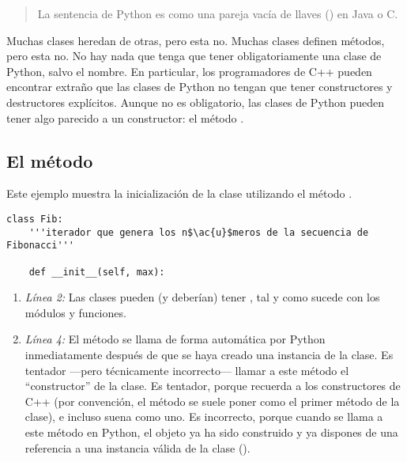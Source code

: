 \begin{quote}
La sentencia  de Python es como una pareja vacía de llaves (\codigo{\{\}}) en Java o C.
\end{quote}

Muchas clases heredan de otras, pero esta no. Muchas clases definen métodos, pero esta no. No hay nada que tenga que tener obligatoriamente una clase de Python, salvo el nombre. En particular, los programadores de C++ pueden encontrar extraño que las clases de Python no tengan que tener constructores y destructores explícitos. Aunque no es obligatorio, las clases de Python pueden tener algo parecido a un constructor: el método .

\subsection{El método }

Este ejemplo muestra la inicialización de la clase  utilizando el método .

\noindent\begin{minipage}{\textwidth}
\begin{lstlisting}[mathescape=True]
class Fib:
    '''iterador que genera los n$\ac{u}$meros de la secuencia de Fibonacci'''

    def __init__(self, max):
\end{lstlisting}
\end{minipage}

\begin{enumerate}

\item \emph{Línea 2:} Las clases pueden (y deberían) tener , tal y como sucede con los módulos y funciones.

\item \emph{Línea 4:} El método  se llama de forma automática por Python inmediatamente después de que se haya creado una instancia de la clase. Es tentador ---pero técnicamente incorrecto--- llamar a este método el ``constructor'' de la clase. Es tentador, porque recuerda a los constructores de C++ (por convención, el método  se suele poner como el primer método de la clase), e incluso suena como uno. Es incorrecto, porque cuando se llama a este método en Python, el objeto ya ha sido construido y ya dispones de una referencia a una instancia válida de la clase ().

\end{enumerate}

